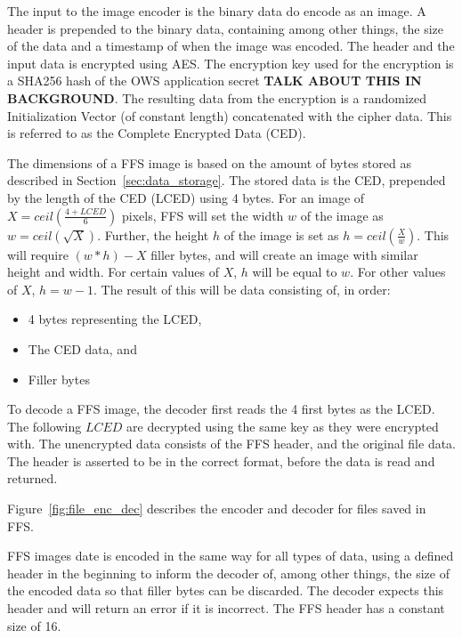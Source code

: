 The input to the image encoder is the binary data do encode as an image. A header is prepended to the binary data, containing among other things, the size of the data and a timestamp of when the image was encoded. The header and the input data is encrypted using AES. The encryption key used for the encryption is a SHA256 hash of the OWS application secret \textbf{TALK ABOUT THIS IN BACKGROUND}. The resulting data from the encryption is a randomized Initialization Vector (of constant length) concatenated with the cipher data. This is referred to as the Complete Encrypted Data (CED).

The dimensions of a FFS image is based on the amount of bytes stored as described in Section~\ref{sec:data_storage}. The stored data is the CED, prepended by the length of the CED (LCED) using 4 bytes. For an image of $X = ceil(\frac{4 + LCED}{6})$ pixels, FFS will set the width $w$ of the image as $w = ceil(\sqrt{X})$. Further, the height $h$ of the image is set as $h = ceil(\frac{X}{w})$. This will require $(w * h) - X$ filler bytes, and will create an image with similar height and width. For certain values of $X$, $h$ will be equal to $w$. For other values of $X$, $h = w-1$. The result of this will be data consisting of, in order:
\begin{itemize}
	\item 4 bytes representing the LCED,
	\item The CED data, and
	\item Filler bytes
\end{itemize}

To decode a FFS image, the decoder first reads the 4 first bytes as the LCED. The following $LCED$ are decrypted using the same key as they were encrypted with. The unencrypted data consists of the FFS header, and the original file data. The header is asserted to be in the correct format, before the data is read and returned.


Figure~\ref{fig:file_enc_dec} describes the encoder and decoder for files saved in FFS.

FFS images date is encoded in the same way for all types of data, using a defined header in the beginning to inform the decoder of, among other things, the size of the encoded data so that filler bytes can be discarded. The decoder expects this header and will return an error if it is incorrect. The FFS header has a constant size of \SI{16}{\byte}. 

